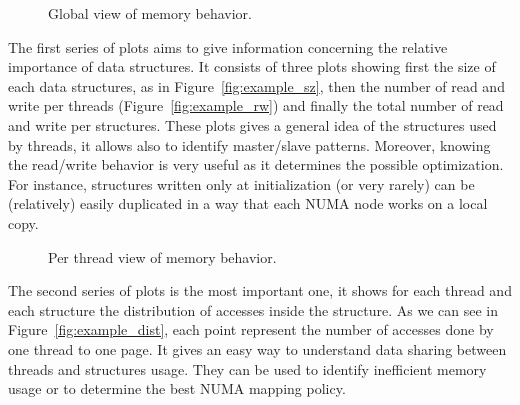 \begin{figure}[htb]
    \centering
    \label{fig:example_plot1}
    \caption{Global view of memory behavior.}
\end{figure}

The first series of plots aims to give information concerning the relative
importance of data structures. It consists of three plots showing first the
size of  each data structures, as in Figure~\ref{fig:example_sz}, then the
number of read and write per threads (Figure~\ref{fig:example_rw}) and
finally the total number of read and write per structures. These plots gives a
general idea of the structures used by threads, it allows also to identify
master/slave patterns.  Moreover, knowing the read/write behavior is very
useful as it determines the possible optimization. For instance, structures
written only at initialization (or very rarely) can be (relatively) easily
duplicated in a way that each NUMA node works on a local copy.

\begin{figure}[htb]
    \centering
    \caption{Per thread view of memory behavior.}
    \label{fig:example_plot2}
\end{figure}

The second series of plots is the most important one, it shows for each thread
and each structure the distribution of accesses inside the structure. As we
can see in Figure~\ref{fig:example_dist}, each point represent the number of
accesses done by one thread to one page. It gives an easy way to understand data
sharing between threads and structures usage. They can be used to identify
inefficient memory usage or to determine the best NUMA mapping policy.



